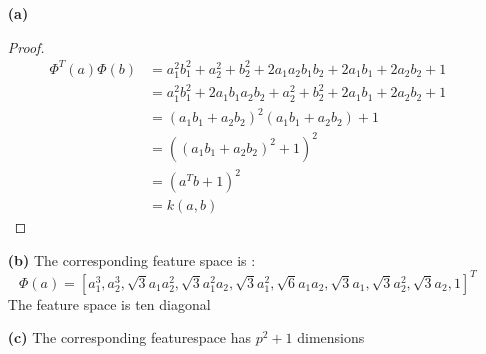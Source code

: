 \begin{itemize}
    \item[\textbf{(a)}] 
    \begin{proof}
        
    
    \begin{align*}
        \Phi^T(a)\Phi(b)    &= a_1^2b_1^2+a_2^2+b_2^2+2a_1a_2b_1b_2+2a_1b_1+2a_2b_2+1\\
                            &= a_1^2b_1^2+ 2a_1b_1a_2b_2+a_2^2+b_2^2+2a_1b_1+2a_2b_2+1\\
                            &=(a_1b_1+a_2b_2)^2(a_1b_1+a_2b_2)+1\\
                            &=((a_1b_1+a_2b_2)^2+1)^2\\
                            &=(a^Tb+1)^2\\
                            &=k(a,b)
    \end{align*}
\end{proof} 
    \item[\textbf{(b)}] The corresponding feature space is :
    \[
    \Phi(a)= [a_1^3,a_2^3,\sqrt{3}a_1a_2^2,\sqrt{3}a_1^2a_2,\sqrt{3}a_1^2,\sqrt{6}a_1a_2,\sqrt{3}a_1,\sqrt{3}a_2^2,\sqrt{3}a_2,1]^T  
    \] 
    The feature space is ten diagonal
\item[\textbf{(c)}] The corresponding featurespace has $p^2+1$ dimensions

\end{itemize}